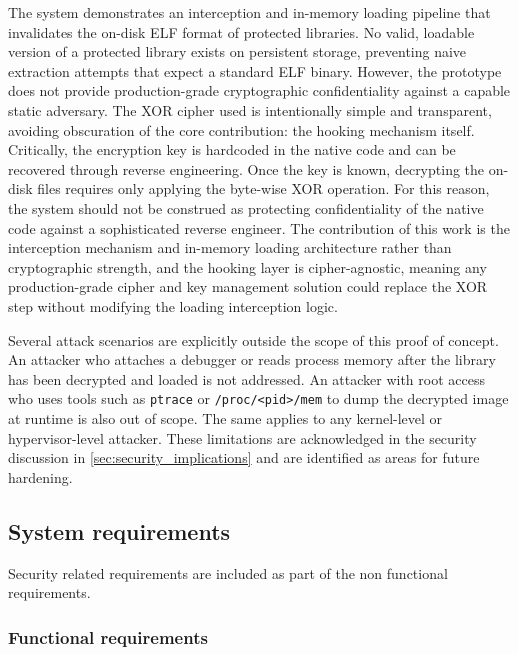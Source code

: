 \documentclass[11pt,a4paper]{report}
\renewcommand\_{{\textunderscore\allowbreak}}
\begin{document}
The system demonstrates an interception and in-memory loading pipeline that invalidates the on-disk ELF format of protected libraries. No valid, loadable version of a protected library exists on persistent storage, preventing naive extraction attempts that expect a standard ELF binary. However, the prototype does not provide production-grade cryptographic confidentiality against a capable static adversary. The XOR cipher used is intentionally simple and transparent, avoiding obscuration of the core contribution: the hooking mechanism itself. Critically, the encryption key is hardcoded in the native code and can be recovered through reverse engineering. Once the key is known, decrypting the on-disk files requires only applying the byte-wise XOR operation. For this reason, the system should not be construed as protecting confidentiality of the native code against a sophisticated reverse engineer. The contribution of this work is the interception mechanism and in-memory loading architecture rather than cryptographic strength, and the hooking layer is cipher-agnostic, meaning any production-grade cipher and key management solution could replace the XOR step without modifying the loading interception logic.

Several attack scenarios are explicitly outside the scope of this proof of concept. An attacker who attaches a debugger or reads process memory after the library has been decrypted and loaded is not addressed. An attacker with root access who uses tools such as \texttt{ptrace} or \texttt{/proc/<pid>/mem} to dump the decrypted image at runtime is also out of scope. The same applies to any kernel-level or hypervisor-level attacker. These limitations are acknowledged in the security discussion in \cref{sec:security_implications} and are identified as areas for future hardening.

\subsection{System requirements} Security related requirements are included as part of the non functional requirements.

\subsubsection{Functional requirements}
\end{document}
